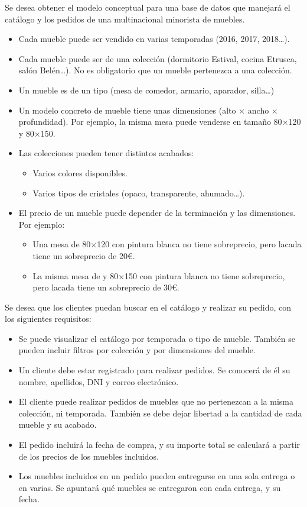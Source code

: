 Se desea obtener el modelo conceptual para una base de datos que manejará el catálogo y los pedidos de una multinacional minorista de muebles.
\begin{itemize}
\item Cada mueble puede ser vendido en varias temporadas (2016, 2017, 2018…).
\item Cada mueble puede ser de una colección (dormitorio Estival, cocina Etrusca, salón Belén…). No es obligatorio que un mueble pertenezca a una colección.
  
\item Un mueble es de un tipo (mesa de comedor, armario, aparador, silla\ldots)
\item Un modelo concreto de mueble tiene unas dimensiones (alto $\times$ ancho $\times$ profundidad). Por ejemplo, la misma mesa puede venderse en tamaño 80$\times$120 y 80$\times$150.
\item Las colecciones pueden tener distintos acabados:
  \begin{itemize}
  \item Varios colores disponibles.
  \item Varios tipos de cristales (opaco, transparente, ahumado…).
  \end{itemize}
\item El precio de un mueble puede depender de la terminación y las dimensiones. Por ejemplo:
  \begin{itemize}
  \item Una mesa de 80$\times$120 con pintura blanca no tiene sobreprecio, pero lacada tiene un sobreprecio de 20\euro.
  \item La misma mesa de y 80$\times$150 con pintura blanca no tiene sobreprecio, pero lacada tiene un sobreprecio de 30\euro.
  \end{itemize}
 
\end{itemize}


Se desea que los clientes puedan buscar en el catálogo y realizar su pedido, con los siguientes requisitos:
\begin{itemize}
\item Se puede visualizar el catálogo por temporada o tipo de mueble. También se pueden incluir filtros por colección y por dimensiones del mueble.
\item Un cliente debe estar registrado para realizar pedidos. Se conocerá de él su nombre, apellidos, DNI y correo electrónico.
\item El cliente puede realizar pedidos de muebles que no pertenezcan a la misma colección, ni temporada. También se debe dejar libertad a la cantidad de cada mueble y su acabado.
\item El pedido incluirá la fecha de compra, y su importe total se calculará a partir de los precios de los muebles incluidos.
\item Los muebles incluidos en un pedido pueden entregarse en una sola entrega o en varias. Se apuntará qué muebles se entregaron con cada entrega, y su fecha.
\end{itemize}

